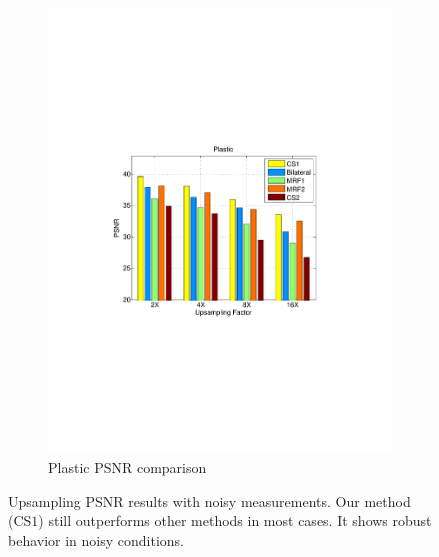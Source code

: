 \documentclass[preprint,10pt,5p,times,twocolumn]{elsarticle}
\begin{document}
\begin{figure}
\begin{subfigure}[b]{0.24\textwidth}
\includegraphics[width=\textwidth]{fig_exp1_plastic_noise.pdf}
\caption*{Plastic PSNR comparison}
\end{subfigure}
\caption{Upsampling PSNR results with noisy measurements. Our method (CS$1$) still outperforms other methods in most cases. It shows robust behavior in noisy conditions.}
\label{fig:exp2}
\end{figure}
\end{document}
